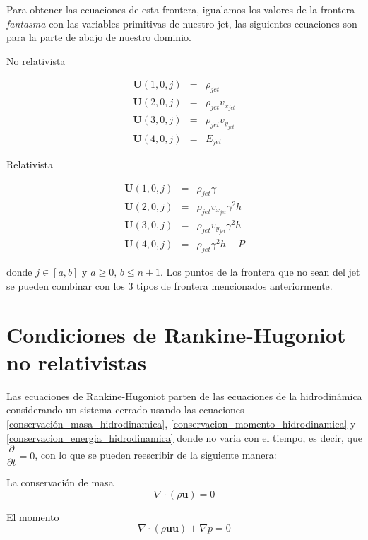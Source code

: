 \documentclass[12pt,a4paper]{book}
\begin{document}
Para obtener las ecuaciones de esta frontera, igualamos los valores de la frontera \emph{fantasma} con las variables primitivas de nuestro jet, las siguientes ecuaciones son para la parte de abajo de nuestro dominio.

No relativista

\begin{eqnarray}
\textbf{U}(1,0,j)&=&\rho_{jet} \\
\textbf{U}(2,0,j)&=& \rho_{jet} v_{x_{jet}}\\
\textbf{U}(3,0,j)&=& \rho_{jet} v_{y_{jet}}\\
\textbf{U}(4,0,j)&=& E_{jet}
\end{eqnarray}

Relativista

\begin{eqnarray}
\textbf{U}(1,0,j)&=&\rho_{jet} \gamma \\
\textbf{U}(2,0,j)&=& \rho_{jet} v_{x_{jet}} \gamma^2 h \\
\textbf{U}(3,0,j)&=& \rho_{jet} v_{y_{jet}} \gamma^2 h \\
\textbf{U}(4,0,j)&=& \rho_{jet} \gamma^2 h-P
\end{eqnarray}

donde $j\in \left[ a,b \right]$ y $a\geq 0, \, b\leq n+1$. Los puntos de la frontera que no sean del jet se pueden combinar con los 3 tipos de frontera mencionados anteriormente.


\chapter{Condiciones de Rankine-Hugoniot no relativistas}\label{aped.C}
Las ecuaciones de Rankine-Hugoniot parten de las ecuaciones de la hidrodinámica considerando un sistema cerrado usando las ecuaciones \ref{conservación_masa_hidrodinamica}, \ref{conservacion_momento_hidrodinamica} y \ref{conservacion_energia_hidrodinamica} donde no varia con el tiempo, es decir, que $\dfrac{\partial}{\partial t}=0$, con lo que se pueden reescribir de la siguiente manera:


La conservación de masa
\begin{equation}
 \nabla \cdot \left( \rho \mathbf{u} \right)=0
\end{equation}

El momento
\begin{equation}
 \nabla \cdot \left( \rho \mathbf{u u} \right) + \nabla p = 0
\end{equation}
\end{document}

